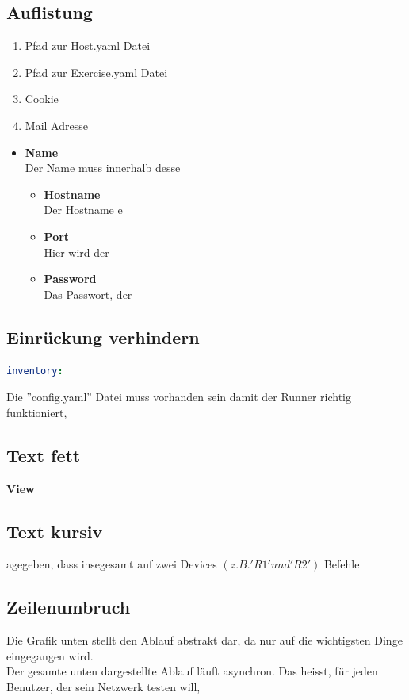 \subsection{Auflistung}

\begin{enumerate}
	\item Pfad zur Host.yaml Datei
	\item Pfad zur Exercise.yaml Datei
	\item Cookie
	\item Mail Adresse
\end{enumerate}

\begin{itemize}
	\item \textbf{Name} \\
		Der Name muss innerhalb desse

	\begin{itemize}
	\item \textbf{Hostname} \\
		Der Hostname e
	\item \textbf{Port} \\
		Hier wird der 
	\item \textbf{Password} \\
		Das Passwort, der
	\end{itemize}
\end{itemize}


\subsection{Einrückung verhindern}
\begin{lstlisting}[language=yaml, caption={config.yaml}]
inventory:
\end{lstlisting}

\noindent Die ''config.yaml'' Datei muss vorhanden sein damit der Runner richtig funktioniert,


\subsection{Text fett}
\textbf{View}


\subsection{Text kursiv}
agegeben, dass insegesamt auf zwei Devices $\left(z.B. 'R1' und 'R2'\right)$ Befehle


\subsection{Zeilenumbruch}
Die Grafik unten stellt den Ablauf abstrakt dar, da nur auf die wichtigsten Dinge eingegangen wird. 
\\
Der gesamte unten dargestellte Ablauf läuft asynchron. Das heisst, für jeden Benutzer, der sein Netzwerk testen will, 


